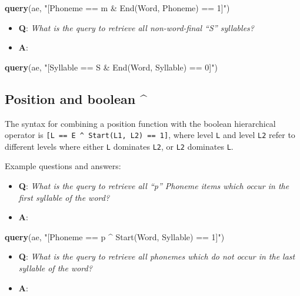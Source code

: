 \documentclass[]{book}
\newenvironment{Shaded}{\begin{snugshade}}{\end{snugshade}}
\newcommand{\KeywordTok}[1]{\textcolor[rgb]{0.13,0.29,0.53}{\textbf{#1}}}
\newcommand{\NormalTok}[1]{#1}
\newcommand{\StringTok}[1]{\textcolor[rgb]{0.31,0.60,0.02}{#1}}
\providecommand{\tightlist}{%
  \setlength{\itemsep}{0pt}\setlength{\parskip}{0pt}}
\begin{document}
\begin{Shaded}
\begin{Highlighting}[]
\KeywordTok{query}\NormalTok{(ae, }\StringTok{"[Phoneme == m & End(Word, Phoneme) == 1]"}\NormalTok{)}
\end{Highlighting}
\end{Shaded}

\begin{itemize}
\tightlist
\item
  \textbf{Q}: \emph{What is the query to retrieve all non-word-final ``S'' syllables?}
\item
  \textbf{A}:
\end{itemize}

\begin{Shaded}
\begin{Highlighting}[]
\KeywordTok{query}\NormalTok{(ae, }\StringTok{"[Syllable == S & End(Word, Syllable) == 0]"}\NormalTok{)}
\end{Highlighting}
\end{Shaded}

\hypertarget{position-and-boolean-1}{%
\subsection{Position and boolean \^{}}\label{position-and-boolean-1}}

The syntax for combining a position function with the boolean hierarchical operator is \texttt{{[}L\ ==\ E\ \^{}\ Start(L1,\ L2)\ ==\ 1{]}}, where level \texttt{L} and level \texttt{L2} refer to different levels where either \texttt{L} dominates \texttt{L2}, or \texttt{L2} dominates \texttt{L}.

Example questions and answers:

\begin{itemize}
\tightlist
\item
  \textbf{Q}: \emph{What is the query to retrieve all ``p'' Phoneme items which occur in the first syllable of the word?}
\item
  \textbf{A}:
\end{itemize}

\begin{Shaded}
\begin{Highlighting}[]
\KeywordTok{query}\NormalTok{(ae, }\StringTok{"[Phoneme == p ^ Start(Word, Syllable) == 1]"}\NormalTok{)}
\end{Highlighting}
\end{Shaded}

\begin{itemize}
\tightlist
\item
  \textbf{Q}: \emph{What is the query to retrieve all phonemes which do not occur in the last syllable of the word?}
\item
  \textbf{A}:
\end{itemize}
\end{document}
